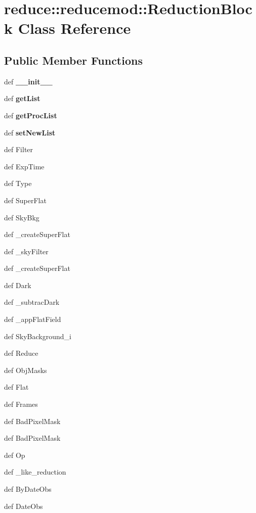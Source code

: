 \section{reduce::reducemod::Reduction\-Block Class Reference}
\label{classreduce_1_1reducemod_1_1ReductionBlock}
\subsection*{Public Member Functions}
\begin{CompactItemize}
\item 
def {\bf\_\-\_\-init\_\-\_\-}
\item 
def \textbf{get\-List}\label{classreduce_1_1reducemod_1_1ReductionBlock_710292c17b35fc3b2976eee612b3766a}

\item 
def \textbf{get\-Proc\-List}\label{classreduce_1_1reducemod_1_1ReductionBlock_4e829b0ed694c57ea4e2d15ef49f8380}

\item 
def \textbf{set\-New\-List}\label{classreduce_1_1reducemod_1_1ReductionBlock_031484ac36e826be69646f61fcdfc5ce}

\item 
def {\bfcheck\-Filter}
\item 
def {\bfcheck\-Exp\-Time}
\item 
def {\bfcheck\-Type}
\item 
def {\bfcreate\-Super\-Flat}
\item 
def {\bfcompute\-Sky\-Bkg}
\item 
def {\bfI\_\-create\-Super\-Flat}
\item 
def {\bfMI\_\-sky\-Filter}
\item 
def {\bfM\_\-create\-Super\-Flat}
\item 
def {\bfsubtract\-Dark}
\item 
def {\bfM\_\-subtrac\-Dark}
\item 
def {\bfM\_\-app\-Flat\-Field}
\item 
def {\bfcompute\-Sky\-Background\_\-i}
\item 
def {\bfsimple\-Reduce}
\item 
def {\bfcreate\-Obj\-Masks}
\item 
def {\bfapply\-Flat}
\item 
def {\bfcombine\-Frames}
\item 
def {\bfcreate\-Bad\-Pixel\-Mask}
\item 
def {\bfapply\-Bad\-Pixel\-Mask}
\item 
def {\bfmath\-Op}
\item 
def {\bfSNAP\_\-like\_\-reduction}
\item 
def {\bfsort\-By\-Date\-Obs}
\item 
def {\bfcomp\-Date\-Obs}
\end{CompactItemize}
